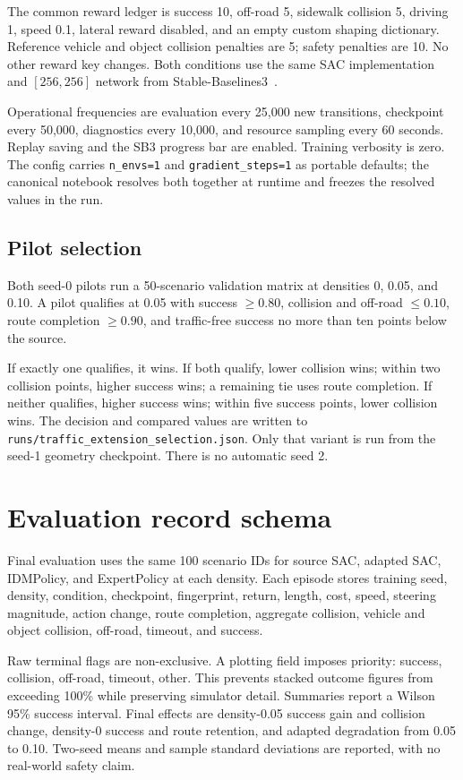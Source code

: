 \documentclass[10pt,twocolumn]{article}
\begin{document}
The common reward ledger is success 10, off-road 5, sidewalk collision 5, driving 1,
speed 0.1, lateral reward disabled, and an empty custom shaping dictionary. Reference
vehicle and object collision penalties are 5; safety penalties are 10. No other reward
key changes. Both conditions use the same SAC implementation and $[256,256]$ network
from Stable-Baselines3~\cite{raffin2021sb3}.

Operational frequencies are evaluation every 25,000 new transitions, checkpoint every
50,000, diagnostics every 10,000, and resource sampling every 60 seconds. Replay saving
and the SB3 progress bar are enabled. Training verbosity is zero. The config carries
\texttt{n\_envs=1} and \texttt{gradient\_steps=1} as portable defaults; the canonical
notebook resolves both together at runtime and freezes the resolved values in the run.

\subsection{Pilot selection}
Both seed-0 pilots run a 50-scenario validation matrix at densities 0, 0.05, and 0.10.
A pilot qualifies at 0.05 with success $\geq0.80$, collision and off-road $\leq0.10$,
route completion $\geq0.90$, and traffic-free success no more than ten points below the
source.

If exactly one qualifies, it wins. If both qualify, lower collision wins; within two
collision points, higher success wins; a remaining tie uses route completion. If neither
qualifies, higher success wins; within five success points, lower collision wins. The
decision and compared values are written to
\texttt{runs/traffic\_extension\_selection.json}. Only that variant is run from the seed-1
geometry checkpoint. There is no automatic seed 2.

\section{Evaluation record schema}
Final evaluation uses the same 100 scenario IDs for source SAC, adapted SAC, IDMPolicy,
and ExpertPolicy at each density. Each episode stores training seed, density, condition,
checkpoint, fingerprint, return, length, cost, speed, steering magnitude, action change,
route completion, aggregate collision, vehicle and object collision, off-road, timeout,
and success.

Raw terminal flags are non-exclusive. A plotting field imposes priority:
success, collision, off-road, timeout, other. This prevents stacked outcome figures from
exceeding 100\% while preserving simulator detail. Summaries report a Wilson 95\%
success interval. Final effects are density-0.05 success gain and collision change,
density-0 success and route retention, and adapted degradation from 0.05 to 0.10.
Two-seed means and sample standard deviations are reported, with no real-world safety
claim.
\end{document}
